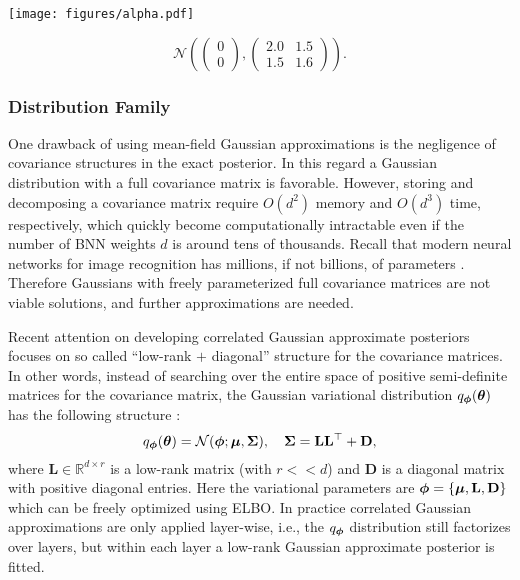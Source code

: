 \begin{center}
\begin{minipage}{.4\textwidth}
    \centering
    \texttt{[image: figures/alpha.pdf]}
\end{minipage}
\hfill
\begin{minipage}{.5\textwidth}
\label{fig: alphadiv}
\begin{equation*}
\mathcal{N} \left(
\begin{pmatrix}
0\\
0
\end{pmatrix},
\begin{pmatrix}
2.0 & 1.5 \\
1.5 & 1.6 
\end{pmatrix} \right).
\end{equation*}
\end{minipage}
\end{center}
%

\subsubsection{Distribution Family}

One drawback of using mean-field Gaussian approximations is the negligence of covariance structures in the exact posterior. In this regard a Gaussian distribution with a full covariance matrix is favorable. However, storing and decomposing a covariance matrix require $O(d^2)$ memory and $O(d^3)$ time, respectively, which quickly become computationally intractable even if the number of BNN weights $d$ is around tens of thousands. Recall that modern neural networks for image recognition has millions, if not billions, of parameters \citep{krizhevsky2012imagenet,dehghani2023scaling}. Therefore Gaussians with freely parameterized full covariance matrices are not viable solutions, and further approximations are needed.

Recent attention on developing correlated Gaussian approximate posteriors focuses on so called ``low-rank $+$ diagonal'' structure for the covariance matrices. In other words, instead of searching over the entire space of positive semi-definite matrices for the covariance matrix, the Gaussian variational distribution $q_{\bm{\phi}}(\bm{\theta})$ has the following structure \citep{tomczak2020efficient}:
\begin{equation}
    q_{\bm{\phi}}(\bm{\theta}) = \mathcal{N}(\bm{\phi}; \bm{\mu}, \mathbf{\Sigma}), \quad \mathbf{\Sigma} = \mathbf{L}\mathbf{L}^\top + \mathbf{D},
\end{equation}
where $\mathbf{L} \in \mathbb{R}^{d \times r}$ is a low-rank matrix (with $r << d$) and $\mathbf{D}$ is a diagonal matrix with positive diagonal entries. Here the variational parameters are $\bm{\phi} = \{\bm{\mu}, \mathbf{L}, \mathbf{D} \}$ which can be freely optimized using ELBO. In practice correlated Gaussian approximations are only applied layer-wise, i.e., the $q_{\bm{\phi}}$ distribution still factorizes over layers, but within each layer a low-rank Gaussian approximate posterior is fitted.

